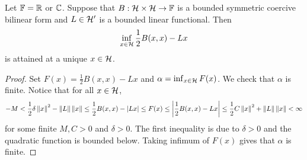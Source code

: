 \begin{theorem}\label{thm:lax_milgram_2}
    Let $\mathbb{F} = \mathbb{R}$ or $\mathbb{C}$. Suppose that $B:\mathcal{H}\times\mathcal{H}\to\mathbb{F}$ is 
    a bounded symmetric coercive bilinear form and $L\in\mathcal{H}'$ is a bounded 
    linear functional. Then 
    \begin{equation*}
        \inf_{x\in\mathcal{H}} \frac{1}{2}B(x,x) - Lx
    \end{equation*}
    is attained at a unique $x\in\mathcal{H}$.
\end{theorem}
\begin{proof}
    Set $F(x) = \frac{1}{2}B(x,x) - Lx$ and $\alpha = \inf_{x\in\mathcal{H}} F(x)$. 
    We check that $\alpha$ is finite. Notice that for all $x\in\mathcal{H}$,
    \begin{equation*}
        -M < \frac{1}{2}\delta\left\lVert {x} \right\rVert^2 - \left\lVert {L} \right\rVert\left\lVert {x} \right\rVert 
        \leq \frac{1}{2}B(x,x) - \left\lvert {Lx} \right\rvert \leq F(x) 
        \leq \left\lvert {\frac{1}{2}B(x,x)-Lx} \right\rvert \leq \frac{1}{2}C\left\lVert {x} \right\rVert^2 + \left\lVert {L} \right\rVert\left\lVert {x} \right\rVert < \infty
    \end{equation*}
    for some finite $M,C>0$ and $\delta>0$. The first inequality is due to 
    $\delta>0$ and the quadratic function is bounded below. Taking infimum 
    of $F(x)$ gives that $\alpha$ is finite. 


\end{proof}
